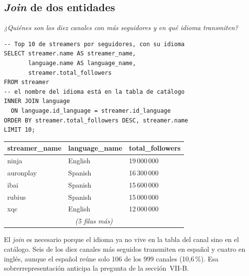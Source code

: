 \documentclass[conference]{IEEEtran}
\begin{document}
\subsection{\emph{Join} de dos entidades}
\emph{¿Quiénes son los diez canales con más seguidores y en qué idioma transmiten?}
\begin{lstlisting}
-- Top 10 de streamers por seguidores, con su idioma
SELECT streamer.name AS streamer_name,
       language.name AS language_name,
       streamer.total_followers
FROM streamer
-- el nombre del idioma está en la tabla de catálogo
INNER JOIN language
  ON language.id_language = streamer.id_language
ORDER BY streamer.total_followers DESC, streamer.name
LIMIT 10;
\end{lstlisting}
\begin{table}[!h]
\centering\footnotesize
\begin{tabular}{@{}lll@{}}
\toprule
streamer\_name & language\_name & total\_followers \\
\midrule
ninja & English & 19\,000\,000 \\
auronplay & Spanish & 16\,300\,000 \\
ibai & Spanish & 15\,600\,000 \\
rubius & Spanish & 15\,000\,000 \\
xqc & English & 12\,000\,000 \\
\multicolumn{3}{c}{\emph{(5 filas más)}} \\
\bottomrule
\end{tabular}
\end{table}
El \emph{join} es necesario porque el idioma ya no vive en la tabla del canal sino en el catálogo. Seis de los diez canales más seguidos transmiten en español y cuatro en inglés, aunque el español reúne solo 106 de los 999 canales (10,6\,\%). Esa sobrerrepresentación anticipa la pregunta de la sección~VII-B.
\end{document}
